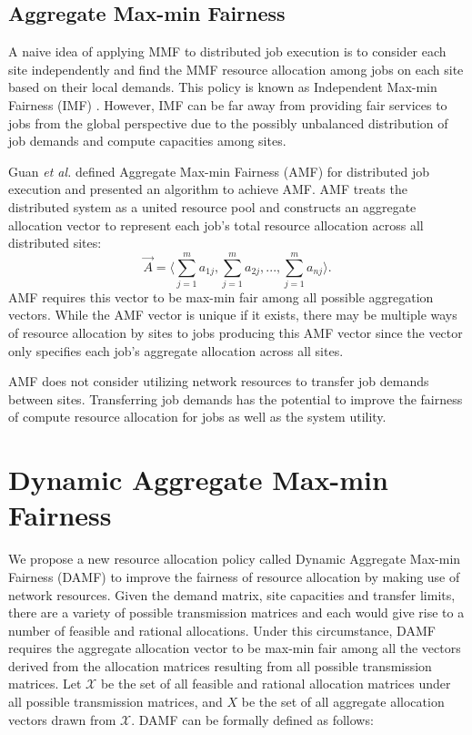 \subsection{Aggregate Max-min Fairness}
A naive idea of applying MMF to distributed job execution is to consider each site independently and find the MMF resource allocation among jobs on each site based on their local demands. This policy is known as Independent Max-min Fairness (IMF) \cite{AMF}. However, IMF can be far away from providing fair services to jobs from the global perspective due to the possibly unbalanced distribution of job demands and compute capacities among sites.

Guan \textit{et al.} \cite{AMF} defined Aggregate Max-min Fairness (AMF) for distributed job execution and presented an algorithm to achieve AMF. AMF treats the distributed system as a united resource pool and constructs an aggregate allocation vector to represent each job's total resource allocation across all distributed sites: 
$$\vec{A} = \langle \sum_{j=1}^m a_{1j},  \sum_{j=1}^m a_{2j}, ..., \sum_{j=1}^m a_{nj} \rangle.$$
AMF requires this vector to be max-min fair among all possible aggregation vectors. While the AMF vector is unique if it exists, there may be multiple ways of resource allocation by sites to jobs producing this AMF vector since the vector only specifies each job's aggregate allocation across all sites. 

AMF does not consider utilizing network resources to transfer job demands between sites. Transferring job demands has the potential to improve the fairness of compute resource allocation for jobs as well as the system utility.

\section{Dynamic Aggregate Max-min Fairness}
\label{sec:DAMF}
We propose a new resource allocation policy called Dynamic Aggregate Max-min Fairness (DAMF) to improve the fairness of resource allocation by making use of network resources. Given the demand matrix, site capacities and transfer limits, there are a variety of possible transmission matrices and each would give rise to a number of feasible and rational allocations. Under this circumstance, DAMF requires the aggregate allocation vector to be max-min fair among all the vectors derived from the allocation matrices resulting from all possible transmission matrices. Let $\mathcal{X}$ be the set of all feasible and rational allocation matrices under all possible transmission matrices, and $X$ be the set of all aggregate allocation vectors drawn from $\mathcal{X}$. DAMF can be formally defined as follows:


